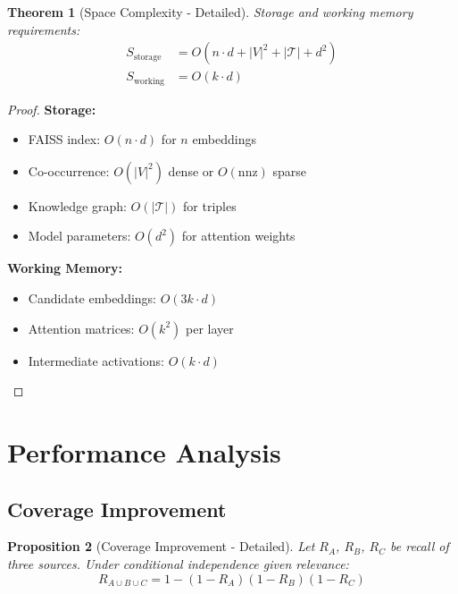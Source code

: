 \documentclass[11pt]{article}
\newtheorem{theorem}{Theorem}
\newtheorem{proposition}[theorem]{Proposition}
\begin{document}
\begin{theorem}[Space Complexity - Detailed]
\label{thm:space_full}
Storage and working memory requirements:
\begin{align}
S_{\text{storage}} &= O(n \cdot d + |V|^2 + |\mathcal{T}| + d^2) \\
S_{\text{working}} &= O(k \cdot d)
\end{align}
\end{theorem}

\begin{proof}
\textbf{Storage:}
\begin{itemize}
    \item FAISS index: $O(n \cdot d)$ for $n$ embeddings
    \item Co-occurrence: $O(|V|^2)$ dense or $O(\text{nnz})$ sparse
    \item Knowledge graph: $O(|\mathcal{T}|)$ for triples
    \item Model parameters: $O(d^2)$ for attention weights
\end{itemize}

\textbf{Working Memory:}
\begin{itemize}
    \item Candidate embeddings: $O(3k \cdot d)$
    \item Attention matrices: $O(k^2)$ per layer
    \item Intermediate activations: $O(k \cdot d)$
\end{itemize}
\end{proof}

\section{Performance Analysis}
\label{sec:performance}

\subsection{Coverage Improvement}

\begin{proposition}[Coverage Improvement - Detailed]
\label{prop:coverage_full}
Let $R_A$, $R_B$, $R_C$ be recall of three sources. Under conditional independence given relevance:
\begin{equation}
R_{A \cup B \cup C} = 1 - (1 - R_A)(1 - R_B)(1 - R_C)
\end{equation}
\end{proposition}
\end{document}
